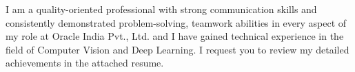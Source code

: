I am a quality-oriented professional with strong communication skills and consistently demonstrated problem-solving, teamwork abilities in every aspect of my role at Oracle India Pvt., Ltd. and I have gained technical experience in the field of {Computer Vision and Deep Learning}. I request you to review my detailed achievements in the attached resume.